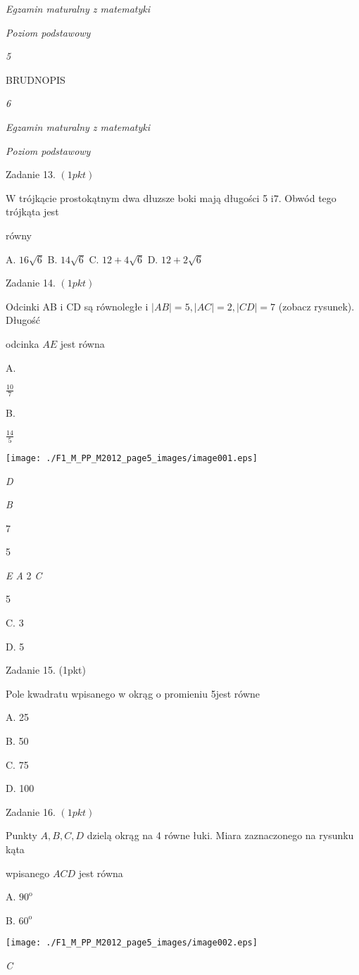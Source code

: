 \documentclass[a4paper,12pt]{article}
\begin{document}
{\it Egzamin maturalny z matematyki}

{\it Poziom podstawowy}

{\it 5}

BRUDNOPIS





{\it 6}

{\it Egzamin maturalny z matematyki}

{\it Poziom podstawowy}

Zadanie 13. $(1pkt)$

$\mathrm{W}$ trójkącie prostokątnym dwa dłuzsze boki mają długości 5 $\mathrm{i}7$. Obwód tego trójkąta jest

równy

A. $16\sqrt{6}$ B. $14\sqrt{6}$ C. $12+4\sqrt{6}$ D. $12+2\sqrt{6}$

Zadanie 14. $(1pkt)$

Odcinki AB $\mathrm{i}$ CD są równoległe i $|AB|=5, |AC|=2, |CD|=7$ (zobacz rysunek). Długość

odcinka $AE$ jest równa

A.

$\displaystyle \frac{10}{7}$

B.

$\displaystyle \frac{14}{5}$
\begin{center}
\texttt{[image: ./F1\_M\_PP\_M2012\_page5\_images/image001.eps]}
\end{center}
{\it D}

{\it B}

7

5

{\it E  A} 2  {\it C}

5

C. 3

D. 5

Zadanie 15. (1pkt)

Pole kwadratu wpisanego w okrąg o promieniu 5jest równe

A. 25

B. 50

C. 75

D. 100

Zadanie 16. $(1pkt)$

Punkty $A, B, C, D$ dzielą okrąg na 4 równe łuki. Miara zaznaczonego na rysunku kąta

wpisanego $ACD$ jest równa

A. $90^{\mathrm{o}}$

B. $60^{\mathrm{o}}$
\begin{center}
\texttt{[image: ./F1\_M\_PP\_M2012\_page5\_images/image002.eps]}
\end{center}
{\it C}
\end{document}
